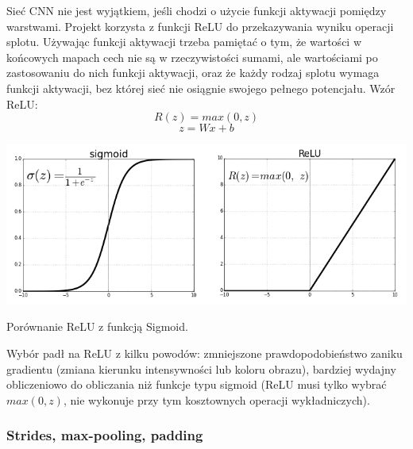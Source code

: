 \documentclass[12pt,a4paper]{article}
\begin{document}
        Sieć CNN nie jest wyjątkiem, jeśli chodzi o użycie funkcji aktywacji pomiędzy warstwami. Projekt korzysta z funkcji ReLU do przekazywania wyniku operacji splotu. Używając funkcji aktywacji trzeba pamiętać o tym, że wartości w końcowych mapach cech nie są w rzeczywistości sumami, ale wartościami po zastosowaniu do nich funkcji aktywacji, oraz że każdy rodzaj splotu wymaga funkcji aktywacji, bez której sieć nie osiągnie swojego pełnego potencjału.
        Wzór ReLU:
        $$R(z)=max(0, z)$$
        $$z=Wx + b$$
        \begin{center}
            \includegraphics[scale=0.35]{act_graph.png}
            \begin{flushright}
                \begin{scriptsize}
                Porównanie ReLU z funkcją Sigmoid.
                \end{scriptsize}
            \end{flushright}
        \end{center}
        Wybór padł na ReLU z kilku powodów: zmniejszone prawdopodobieństwo zaniku gradientu (zmiana kierunku intensywności lub koloru obrazu), bardziej wydajny obliczeniowo do obliczania niż funkcje typu sigmoid (ReLU musi tylko wybrać $max(0, z)$, nie wykonuje przy tym kosztownych operacji wykładniczych).
    \subsubsection{Strides, max-pooling, padding}
    
\end{document}
